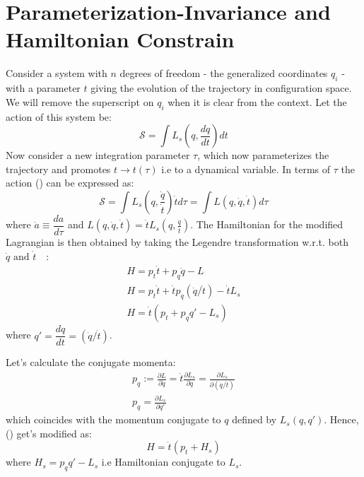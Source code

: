 \section*{Parameterization-Invariance and Hamiltonian Constrain}
Consider a system with $n$ degrees of freedom - the generalized coordinates $q_i$ - with a parameter $t$ giving the evolution of the trajectory in configuration space. We will remove the superscript
on $q_i$ when it is clear from the context. Let the action of this system be:
\begin{equation}
	\label{eq:action_t}
	\mathcal{S} = \int L_s\left(q, \frac{dq}{dt}\right)  dt
\end{equation}
Now consider a new integration parameter \(\tau\), which now parameterizes the trajectory and promotes \(t \to t(\tau)\) 
i.e to a dynamical variable.
In terms of \(\tau\) the action () can be expressed as:
\begin{equation}
	\mathcal{S} = \int L_s\left(q, \frac{\Dot{q}}{\Dot{t}}\right)  \Dot{t} d\tau =  \int L\left(q, \Dot{q}, \Dot{t}\right)   d\tau
\end{equation}
where \(\dot{a} \equiv \dfrac{d a}{d \tau}\) and 
\(L\left(q, \Dot{q}, \Dot{t}\right) = \Dot{t}L_s\left(q, \frac{\Dot{q}}{\Dot{t}}\right)  \).
The Hamiltonian for the modified Lagrangian is then obtained by taking the Legendre
transformation w.r.t. both \(\dot{q} \text{ and } \dot{t}\)\ ~\cite{deriglazov2011reparametrization}:
\begin{equation}
	\label{eq:hamlt_L}
	\begin{gathered}
		H =  p_t \dot{t} + p_q \dot{q} - L\\
		H =  p_t \dot{t} + \dot{t} p_q (\dot{q}/\dot{t}) - \dot{t}L_s\\
		H  = \dot{t} \left(p_t + p_q q'- L_s\right)
	\end{gathered}
\end{equation}
where \(q'=\dfrac{dq}{dt}=(\dot{q}/\dot{t})\).

Let's calculate the conjugate momenta:
\begin{equation}
	\begin{gathered}
		p_q := \frac{\partial L}{\partial\dot{q}}
		= \dot{t}\frac{\partial L_s}{\partial\dot{q}}
		=\frac{\partial L_s}{\partial(\dot{q}/ \dot{t})}\\
		p_q = \frac{\partial L_s}{\partial q'}
	\end{gathered}
\end{equation}
which coincides with the momentum conjugate to $q$ defined by $L_s(q, q′)$. Hence, () get's modified as:
\begin{equation}
	\label{eq:hamil_contrain_Hs}
	H  = \dot{t} \left(p_t + H_s\right)
\end{equation}
where \(H_s = p_q q'- L_s\) i.e Hamiltonian conjugate to \(L_s\).

